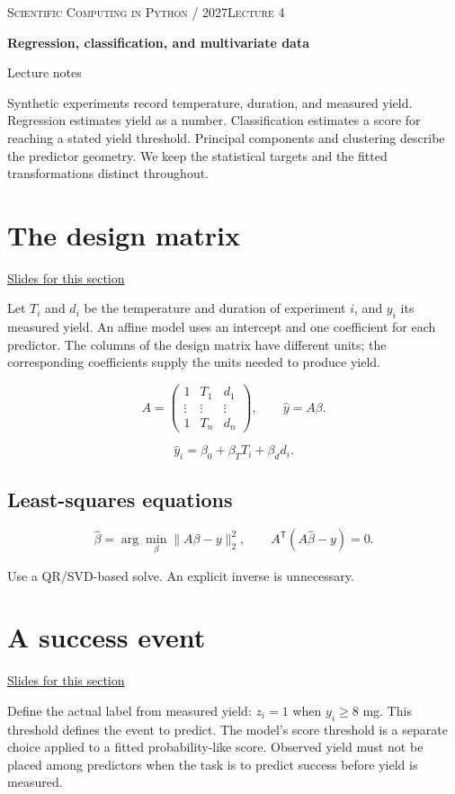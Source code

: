 \documentclass[11pt,letterpaper]{article}
\theoremstyle{definition}\newtheorem{definition}{Definition}\newtheorem{example}{Example}
\numberwithin{equation}{section}
\begin{document}
{\small\scshape Scientific Computing in Python / 2027\hfill Lecture 4}\par\medskip
{\raggedright{}\LARGE\bfseries\color{ink} Regression, classification, and multivariate data\par}\medskip
{\small Lecture notes}\par\bigskip
Synthetic experiments record temperature, duration, and measured yield. Regression estimates yield as a number. Classification estimates a score for reaching a stated yield threshold. Principal components and clustering describe the predictor geometry. We keep the statistical targets and the fitted transformations distinct throughout.

\section{The design matrix}
\hypertarget{note-the-design-matrix}{}\label{note:the-design-matrix}
{\small \href{slides.html\#frame=the-design-matrix\&step=1}{Slides for this section}}\par
Let $T_i$ and $d_i$ be the temperature and duration of experiment $i$, and $y_i$ its measured yield. An affine model uses an intercept and one coefficient for each predictor. The columns of the design matrix have different units; the corresponding coefficients supply the units needed to produce yield.

\[
A=\begin{pmatrix}1&T_1&d_1\\\vdots&\vdots&\vdots\\1&T_n&d_n\end{pmatrix},\qquad
\widehat y=A\beta.
\]

\[
\widehat y_i=\beta_0+\beta_TT_i+\beta_dd_i.
\]

\subsection*{Least-squares equations}
\[
\widehat\beta=\arg\min_\beta\|A\beta-y\|_2^2,
\qquad A^{\mathsf T}(A\widehat\beta-y)=0.
\]

Use a QR/SVD-based solve. An explicit inverse is unnecessary.
\section{A success event}
\hypertarget{note-a-success-event}{}\label{note:a-success-event}
{\small \href{slides.html\#frame=a-success-event\&step=1}{Slides for this section}}\par
Define the actual label from measured yield: $z_i=1$ when $y_i\geq8$ mg. This threshold defines the event to predict. The model's score threshold is a separate choice applied to a fitted probability-like score. Observed yield must not be placed among predictors when the task is to predict success before yield is measured.
\end{document}
